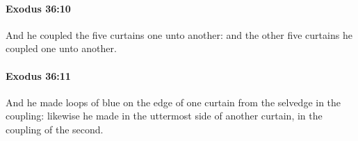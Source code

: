 		\paragraph{Exodus 36:10} %
			\label{EXODUS-36-10}

			And he coupled the five curtains one unto another: and the other five curtains he coupled one unto another.


		\paragraph{Exodus 36:11} %
			\label{EXODUS-36-11}

			And he made loops of blue on the edge of one curtain from the selvedge in the coupling: likewise he made in the uttermost side of another curtain, in the coupling of the second.


